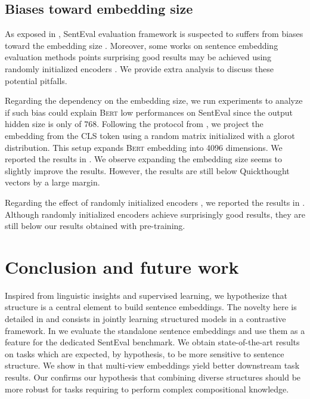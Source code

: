 
\subsection{Biases toward embedding size}

As exposed in , SentEval evaluation framework is suspected to suffers from biases toward the embedding size \parencite{eger_19}. Moreover, some works on sentence embedding evaluation methods points surprising good results may be achieved using randomly initialized encoders \parencite{wieting_19}. We provide extra analysis to discuss these potential pitfalls.

Regarding the dependency on the embedding size, we run experiments to analyze if such bias could explain \textsc{Bert} low performances on SentEval since the output hidden size is only of $768$. Following the protocol from \textcite{wieting_19}, we project the embedding from the \textsc{CLS} token using a random matrix initialized with a glorot distribution. This setup expands \textsc{Bert} embedding into 4096 dimensions. We reported the results in . We observe expanding the embedding size seems to slightly improve the results. However, the results are still below Quickthought vectors by a large margin.

Regarding the effect of randomly initialized encoders \parencite{wieting_19}, we reported the results in . Although randomly initialized encoders achieve surprisingly good results, they are still below our results obtained with pre-training.

\section{Conclusion and future work}

Inspired from linguistic insights and supervised learning, we hypothesize that structure is a central element to build sentence embeddings. The novelty here is detailed in  and consists in jointly learning structured models in a contrastive framework. In  we evaluate the standalone sentence embeddings and use them as a feature for the dedicated SentEval benchmark. We obtain state-of-the-art results on tasks which are expected, by hypothesis, to be more sensitive to sentence structure. We show in  that multi-view embeddings yield better downstream task results. Our  confirms our hypothesis that combining diverse structures should be more robust for tasks requiring to perform complex compositional knowledge.